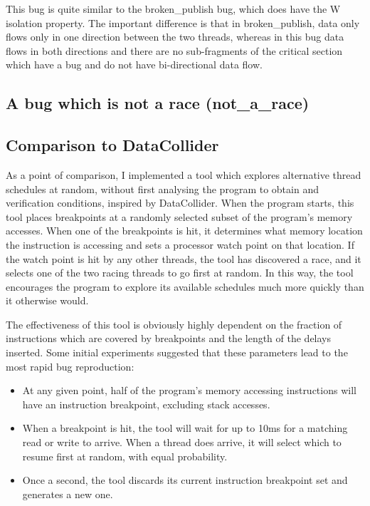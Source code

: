 This bug is quite similar to the broken\_publish bug, which does have
the W isolation property.  The important difference is that in
broken\_publish, data only flows only in one direction between the two
threads, whereas in this bug data flows in both directions and there
are no sub-fragments of the critical section which have a bug and do
not have bi-directional data flow.

\subsection{A bug which is not a race (not\_a\_race)}


\subsection{Comparison to DataCollider}
\label{sect:eval:datacollider}

As a point of comparison, I implemented a tool which explores
alternative thread schedules at random, without first analysing the
program to obtain {\StateMachines} and verification conditions,
inspired by DataCollider\needCite{}.  When the program starts, this
tool places breakpoints at a randomly selected subset of the program's
memory accesses.  When one of the breakpoints is hit, it determines
what memory location the instruction is accessing and sets a processor
watch point\needCite{} on that location.  If the watch point is hit by
any other threads, the tool has discovered a race, and it selects one
of the two racing threads to go first at random.  In this way, the
tool encourages the program to explore its available schedules much
more quickly than it otherwise would.

The effectiveness of this tool is obviously highly dependent on the
fraction of instructions which are covered by breakpoints and the
length of the delays inserted.  Some initial experiments suggested that these parameters lead
to the most rapid bug reproduction:

\begin{itemize}
\item
  At any given point, half of the program's memory accessing
  instructions will have an instruction breakpoint, excluding stack
  accesses.
\item
  When a breakpoint is hit, the tool will wait for up to 10ms for a
  matching read or write to arrive.  When a thread does arrive, it
  will select which to resume first at random, with equal probability.
\item
  Once a second, the tool discards its current instruction breakpoint
  set and generates a new one.
\end{itemize}

